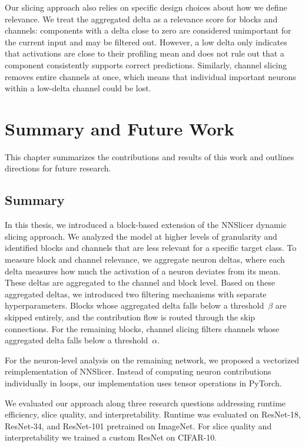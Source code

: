 \documentclass[
12pt,
fancyheadings,
a4paper,
twoside,
BCOR=0.7cm,
nobcorignoretitle,
grayscalebody,
]{stsreprt}
\begin{document}
Our slicing approach also relies on specific design choices about how we define relevance.
We treat the aggregated delta as a relevance score for blocks and channels: components with a delta
close to zero are considered unimportant for the current input and may be filtered out.
However, a low delta only indicates that activations are close to their profiling mean and does not
rule out that a component consistently supports correct predictions.
Similarly, channel slicing removes entire channels at once, which means that individual important
neurons within a low-delta channel could be lost.


\chapter{Summary and Future Work}

This chapter summarizes the contributions and results of this work and outlines directions for
future research.

\section{Summary}

In this thesis, we introduced a block-based extension of the NNSlicer dynamic slicing approach.
We analyzed the model at higher levels of granularity and identified blocks and channels that are
less relevant for a specific target class.
To measure block and channel relevance, we aggregate neuron deltas, where each delta measures how
much the activation of a neuron deviates from its mean.
These deltas are aggregated to the channel and block level.
Based on these aggregated deltas, we introduced two filtering mechanisms with separate
hyperparameters.
Blocks whose aggregated delta falls below a threshold~$\beta$ are skipped entirely, and the
contribution flow is routed through the skip connections.
For the remaining blocks, channel slicing filters channels whose aggregated delta falls below a
threshold~$\alpha$.

For the neuron-level analysis on the remaining network, we proposed a vectorized reimplementation
of NNSlicer.
Instead of computing neuron contributions individually in loops, our implementation uses tensor
operations in PyTorch.

We evaluated our approach along three research questions addressing runtime efficiency, slice
quality, and interpretability.
Runtime was evaluated on ResNet-18, ResNet-34, and ResNet-101 pretrained on ImageNet.
For slice quality and interpretability we trained a custom ResNet on CIFAR-10.
\end{document}
